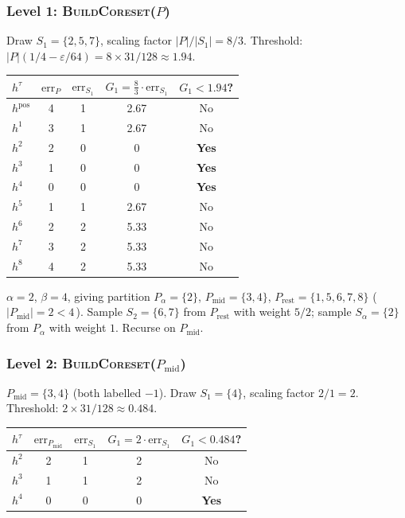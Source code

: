 \documentclass[11pt, a4paper]{article}
\theoremstyle{boxed}
\begin{document}
\subsubsection*{Level 1: \textsc{BuildCoreset}($P$)}

Draw $S_1=\{2,5,7\}$, scaling factor $|P|/|S_1|=8/3$.
Threshold: $|P|(1/4-\varepsilon/64)=8\times 31/128\approx 1.94$.

\smallskip
\begin{center}\small
\begin{tabular}{lcccc}
\hline
$h^\tau$ & $\mathrm{err}_P$ & $\mathrm{err}_{S_1}$ & $G_1=\tfrac{8}{3}\cdot\mathrm{err}_{S_1}$ & $G_1<1.94$? \\
\hline
$h^{\mathrm{pos}}$ & 4 & 1 & 2.67 & No \\
$h^1$ & 3 & 1 & 2.67 & No \\
$h^2$ & 2 & 0 & 0 & \textbf{Yes} \\
$h^3$ & 1 & 0 & 0 & \textbf{Yes} \\
$h^4$ & 0 & 0 & 0 & \textbf{Yes} \\
$h^5$ & 1 & 1 & 2.67 & No \\
$h^6$ & 2 & 2 & 5.33 & No \\
$h^7$ & 3 & 2 & 5.33 & No \\
$h^8$ & 4 & 2 & 5.33 & No \\
\hline
\end{tabular}
\end{center}

\smallskip\noindent
$\alpha=2$, $\beta=4$, giving partition
$P_\alpha=\{2\}$, $P_{\mathrm{mid}}=\{3,4\}$, $P_{\mathrm{rest}}=\{1,5,6,7,8\}$
($|P_{\mathrm{mid}}|=2<4$\,\checkmark).
Sample $S_2=\{6,7\}$ from $P_{\mathrm{rest}}$ with weight $5/2$;
sample $S_\alpha=\{2\}$ from $P_\alpha$ with weight $1$.
Recurse on $P_{\mathrm{mid}}$.

\subsubsection*{Level 2: \textsc{BuildCoreset}($P_{\mathrm{mid}}$)}

$P_{\mathrm{mid}}=\{3,4\}$ (both labelled $-1$).
Draw $S_1=\{4\}$, scaling factor $2/1=2$.
Threshold: $2\times 31/128\approx 0.484$.

\smallskip
\begin{center}\small
\begin{tabular}{lcccc}
\hline
$h^\tau$ & $\mathrm{err}_{P_{\mathrm{mid}}}$ & $\mathrm{err}_{S_1}$ & $G_1=2\cdot\mathrm{err}_{S_1}$ & $G_1<0.484$? \\
\hline
$h^2$ & 2 & 1 & 2 & No \\
$h^3$ & 1 & 1 & 2 & No \\
$h^4$ & 0 & 0 & 0 & \textbf{Yes} \\
\hline
\end{tabular}
\end{center}
\end{document}
